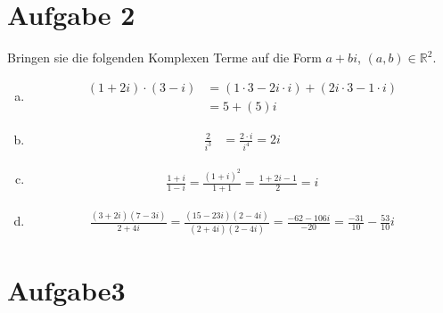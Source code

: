 \documentclass{scrreprt}
\newcommand{\RR}{\mathbb{R}}
\begin{document}
\section*{Aufgabe 2}
Bringen sie die folgenden Komplexen Terme auf die Form $a + b i$, $(a,b) \in \RR^2$.
\begin{enumerate}[(a)]
\item
    \begin{align*}
        (1 + 2i) \cdot (3-i) & = (1 \cdot 3 - 2i \cdot i) + (2i \cdot 3 - 1 \cdot i)\\
        & = 5 + (5)i
    \end{align*}
\item
    \begin{align*}
        \frac{2}{i^3} & = \frac{2\cdot i}{i^4} = 2i
    \end{align*}
\item
    \begin{align*}
        \frac{1+i}{1-i} = \frac{(1+i)^2}{1 + 1} = \frac{1 + 2i - 1}{2} = i
    \end{align*}
\item
    \begin{align*}
        \frac{(3 + 2i)(7 - 3i)}{2 + 4i} = \frac{(15-23i)(2-4i)}{(2+4i)(2-4i)} = \frac{-62 - 106i}{-20} = \frac{-31}{10} - \frac{53}{10}i
    \end{align*}
\end{enumerate}

\section*{Aufgabe3}
\end{document}
